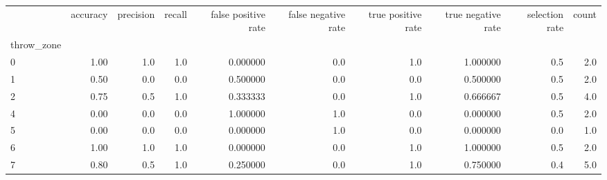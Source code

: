 \begin{tabular}{lrrrrrrrrr}
\toprule
{} &  accuracy &  precision &  recall &  false positive rate &  false negative rate &  true positive rate &  true negative rate &  selection rate &  count \\
throw\_zone &           &            &         &                      &                      &                     &                     &                 &        \\
\midrule
0          &      1.00 &        1.0 &     1.0 &             0.000000 &                  0.0 &                 1.0 &            1.000000 &             0.5 &    2.0 \\
1          &      0.50 &        0.0 &     0.0 &             0.500000 &                  0.0 &                 0.0 &            0.500000 &             0.5 &    2.0 \\
2          &      0.75 &        0.5 &     1.0 &             0.333333 &                  0.0 &                 1.0 &            0.666667 &             0.5 &    4.0 \\
4          &      0.00 &        0.0 &     0.0 &             1.000000 &                  1.0 &                 0.0 &            0.000000 &             0.5 &    2.0 \\
5          &      0.00 &        0.0 &     0.0 &             0.000000 &                  1.0 &                 0.0 &            0.000000 &             0.0 &    1.0 \\
6          &      1.00 &        1.0 &     1.0 &             0.000000 &                  0.0 &                 1.0 &            1.000000 &             0.5 &    2.0 \\
7          &      0.80 &        0.5 &     1.0 &             0.250000 &                  0.0 &                 1.0 &            0.750000 &             0.4 &    5.0 \\
\bottomrule
\end{tabular}
